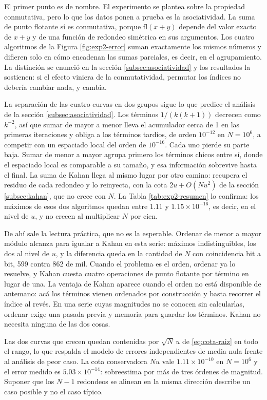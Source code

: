 El primer punto es de nombre. El experimento se plantea sobre la propiedad conmutativa, pero lo que
los datos ponen a prueba es la asociatividad. La suma de punto flotante sí es conmutativa, porque
$\mathrm{fl}(x + y)$ depende del valor exacto de $x + y$ y de una función de redondeo simétrica en
sus argumentos. Los cuatro algoritmos de la Figura \ref{fig:exp2-error} suman exactamente los mismos
números y difieren solo en cómo encadenan las sumas parciales, es decir, en el agrupamiento. La
distinción se enunció en la sección \ref{subsec:asociatividad} y los resultados la sostienen: si el
efecto viniera de la conmutatividad, permutar los índices no debería cambiar nada, y cambia.

La separación de las cuatro curvas en dos grupos sigue lo que predice el análisis de la sección
\ref{subsec:asociatividad}. Los términos $1/(k(k+1))$ decrecen como $k^{-2}$, así que sumar de mayor
a menor lleva el acumulador cerca de 1 en las primeras iteraciones y obliga a los términos tardíos,
de orden $10^{-12}$ en $N = 10^{6}$, a competir con un espaciado local del orden de $10^{-16}$. Cada
uno pierde su parte baja. Sumar de menor a mayor agrupa primero los términos chicos entre sí, donde
el espaciado local es comparable a su tamaño, y esa información sobrevive hasta el final. La suma de
Kahan llega al mismo lugar por otro camino: recupera el residuo de cada redondeo y lo reinyecta, con la cota
$2u + O(Nu^{2})$ de la sección \ref{subsec:kahan}, que no crece con $N$. La Tabla
\ref{tab:exp2-resumen} lo confirma: los máximos de esos dos algoritmos quedan entre
$1.11$ y $1.15 \times 10^{-16}$, es decir, en el nivel de $u$, y no crecen al multiplicar $N$ por
cien.

De ahí sale la lectura práctica, que no es la esperable. Ordenar de menor a mayor módulo alcanza
para igualar a Kahan en esta serie: máximos indistinguibles, los dos al nivel de $u$, y la
diferencia queda en
la cantidad de $N$ con coincidencia bit a bit, 599 contra 862 de mil. Cuando el problema es el
orden, ordenar ya lo resuelve, y Kahan cuesta cuatro operaciones de punto flotante por término en
lugar de una. La ventaja de Kahan aparece cuando el orden no está disponible de antemano: acá los
términos vienen ordenados por construcción y basta recorrer el índice al revés. En una serie cuyas
magnitudes no se conocen sin calcularlas, ordenar exige una pasada previa y memoria para
guardar los términos. Kahan no necesita ninguna de las dos cosas.

Las dos curvas que crecen quedan contenidas por $\sqrt{N}\,u$ de \eqref{eq:cota-raiz} en todo el
rango, lo que respalda el modelo de errores independientes de media nula frente al análisis de peor
caso. La cota conservadora $Nu$ vale $1.11 \times 10^{-10}$ en $N = 10^{6}$ y el error medido es
$5.03 \times 10^{-14}$: sobreestima por más de tres órdenes de magnitud. Suponer que los $N-1$
redondeos se alinean en la misma dirección describe un caso posible y no el caso típico.

